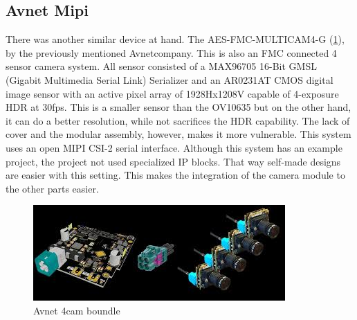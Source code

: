 \subsection{Avnet Mipi} %
There was another similar device at hand.
The AES-FMC-MULTICAM4-G (\cref{fig:avnet_mipi}), by the previously mentioned Avnet\texttrademark company.
This is also an FMC connected 4 sensor camera system.
All sensor consisted of a MAX96705 16-Bit GMSL (Gigabit Multimedia Serial Link) Serializer and an AR0231AT CMOS digital image sensor with an active pixel array of 1928Hx1208V capable of 4-exposure HDR at 30fps.
This is a smaller sensor than the OV10635 but on the other hand, it can do a better resolution, while not sacrifices the HDR capability.
The lack of cover and the modular assembly, however, makes it more vulnerable.
This system uses an open MIPI CSI-2 serial interface.
Although this system has an example project, the project not used specialized IP blocks.
That way self-made designs are easier with this setting.
This makes the integration of the camera module to the other parts easier.
\begin{figure}
    \centering
    \includegraphics[width=\linewidth]{images/avnet_mipi.jpeg}
    \caption{Avnet 4cam boundle \cite{avnet_mipi_img}}
    \label{fig:avnet_mipi}
\end{figure}


